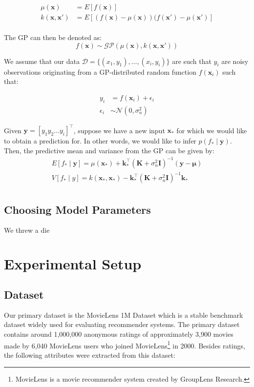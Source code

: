 \documentclass[letterpaper]{article}
\begin{document}
\begin{align*}
	\mu(\textbf{x}) &= E[f(\textbf{x})] \\
	k(\textbf{x}, \textbf{x}') &= E[(f(\textbf{x}) - \mu(\textbf{x}))(f(\textbf{x}') - \mu(\textbf{x}')] \\
\end{align*}

The GP can then be denoted as:
\[f(\textbf{x}) \sim \mathcal{GP}(\mu(\textbf{x}), k(\textbf{x}, \textbf{x}'))\]

We assume that our data $\mathcal{D} = \{(x_1, y_1), \ldots, (x_i, y_i)\}$ are such that $y_i$ are noisy observations originating from a GP-distributed random function $f(\textbf{x}_i)$ such that:

\begin{align*}
	y_i &= f(\textbf{x}_i) + \epsilon_i \\
	\epsilon_i &\sim \mathcal{N}(0, \sigma_n^2)
\end{align*}

Given $\textbf{y} = [y_1y_2\ldots y_i]^\top$, suppose we have a new input $\textbf{x}_*$ for which we would like to obtain a prediction for. In other words, we would like to infer $p(f_* \mid \textbf{y})$. Then, the predictive mean and variance from the GP can be given by:
\begin{align*}
	E[f_* \mid \textbf{y}] = \mu(\textbf{x}_*) + \textbf{k}_*^\top (\textbf{K} + \sigma_n^2 \textbf{I})^{-1} (\textbf{y} - \boldsymbol{\mu}) \\
	V[f_* \mid y] = k(\textbf{x}_*, \textbf{x}_*) - \textbf{k}_*^\top (\textbf{K} + \sigma_n^2 \textbf{I})^{-1} \textbf{k}_* \\
\end{align*}

\subsection{Choosing Model Parameters}
We threw a die

\section{Experimental Setup}
\subsection{Dataset}
Our primary dataset is the MovieLens 1M Dataset which is a stable benchmark dataset widely used for evaluating recommender systems. The primary dataset contains around 1,000,000 anonymous ratings of approximately 3,900 movies made by 6,040 MovieLens users who joined MovieLens\footnote{MovieLens is a movie recommender system created by GroupLens Research.} in 2000. Besides ratings, the following attributes were extracted from this dataset:
\end{document}
